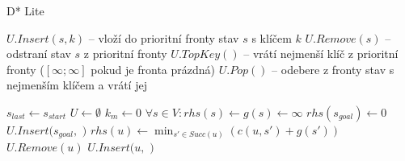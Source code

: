 \begin{algorithm}[H]
	\caption{D* Lite}
	\label{alg:DStarLiteP1}
	\begin{algorithmic}[1]
		\Statex %
		$U.Insert(s,k)$ -- vloží do prioritní fronty stav $s$ s klíčem $k$
		\Statex %
		$U.Remove(s)$ -- odstraní stav $s$ z prioritní fronty
		\Statex %
		$U.TopKey()$ -- vrátí nejmenší klíč z prioritní fronty ($[\infty;\infty]$ pokud je fronta prázdná)
		\Statex %
		$U.Pop()$ -- odebere z fronty stav s nejmenším klíčem a vrátí jej\strut
		\Statex
			\State $s_{last}\gets s_{start}$
			\State $U\gets \emptyset$
			\State $k_m\gets 0$
			\State $\forall s\in V: rhs(s)\gets g(s)\gets \infty$
			\State $rhs(s_{goal})\gets 0$
			\State $U.Insert(s_{goal},$ $)$
		\EndFunction
		\Statex
				\State $rhs(u)\gets \min_{s'\in Succ(u)}(c(u,s')+g(s'))$
			\EndIf
				\State $U.Remove(u)$
			\EndIf
				\State $U.Insert(u,$ $)$
			\EndIf
		\EndFunction
	\end{algorithmic}
\end{algorithm}

